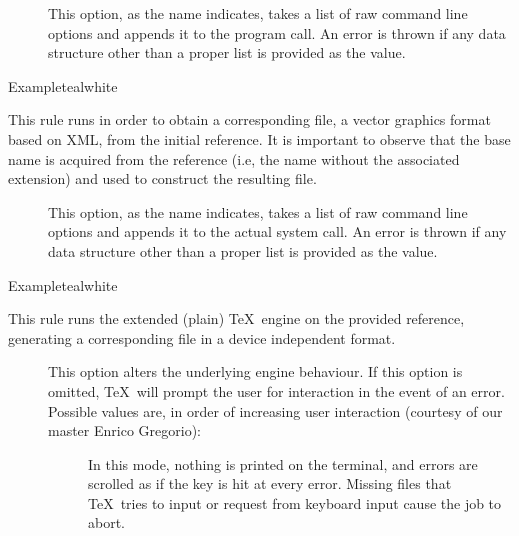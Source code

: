 \begin{description}
\begin{description}
\item[] This option, as the name indicates, takes a list of raw command line options and appends it to the  program call. An error is thrown if any data structure other than a proper list is provided as the value.
\end{description}

\begin{codebox}{Example}{teal}{\icnote}{white}
\end{codebox}

\item[\rulebox{dvisvgm}{samcarter}] This rule runs  in order to obtain a corresponding  file, a vector graphics format based on XML, from the initial  reference. It is important to observe that the base name is acquired from the  reference (i.e, the name without the associated extension) and used to construct the resulting file.

\begin{description}
\item[] This option, as the name indicates, takes a list of raw command line options and appends it to the actual system call. An error is thrown if any data structure other than a proper list is provided as the value.
\end{description}

\begin{codebox}{Example}{teal}{\icnote}{white}
\end{codebox}

\item[\rulebox{etex}{Marco Daniel, Paulo Cereda, Nicola Talbot}] This rule runs the  extended (plain) \TeX\ engine on the provided  reference, generating a corresponding file in a device independent format.

\begin{description}
\item[] This option alters the underlying engine behaviour. If this option is omitted, \TeX\ will prompt the user for interaction in the event of an error. Possible values are, in order of increasing user interaction (courtesy of our master Enrico Gregorio):

\begin{description}
\item[] In this mode, nothing is printed on the terminal, and errors are scrolled as if the  key is hit at every error. Missing files that \TeX\ tries to input or request from keyboard input cause the job to abort.


\end{description}
\end{description}
\end{description}
